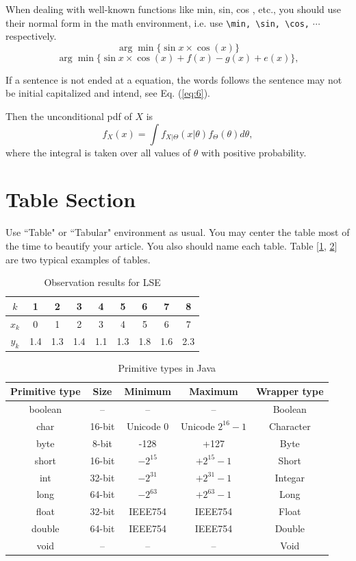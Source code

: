 \documentclass[print]{jicspack}
\begin{document}
When dealing with well-known functions like min, sin, cos , etc.,
you should use their normal form in the math environment, i.e. use
\verb|\min, \sin, \cos,| $\cdots$ respectively.
$$\arg\min\{\sin{x}\times\cos(x)\}$$
$$\arg\min\{\sin{x}\times\cos(x)+f(x)-g(x)+e(x)\},$$

If a sentence is not ended at a equation, the words follows the
sentence may not be initial capitalized and intend, see Eq.
(\ref{eq:6}).

 Then the unconditional pdf of $X$ is
\begin{equation}\label{eq:6}
f_X(x)=\int f_{X|\Theta}(x|\theta)f_{\Theta}(\theta)d\theta,
\end{equation}
where the integral is taken over all values of $\theta$ with positive probability.
\section{Table Section}
Use ``Table" or ``Tabular" environment as usual. You may center
the table most of the time to beautify your article. You also
should name each table. Table [\ref{lab:1}, \ref{lab:2}] are two
typical examples of tables.
\begin{table}[h]
\centering \caption{Observation results for LSE} \label{lab:1}
\begin{tabular}{|c|c|c|c|c|c|c|c|c|}
\hline $k$   & 1 & 2 & 3 & 4 & 5 & 6 & 7 & 8\\
\hline $x_k$ & 0 & 1 & 2 & 3 & 4 & 5 & 6 & 7\\
\hline $y_k$ & 1.4 & 1.3 & 1.4 & 1.1 & 1.3 & 1.8 & 1.6 & 2.3\\
\hline
\end{tabular}
\end{table}
\begin{table}[h]
\centering \caption{Primitive types in Java}
\label{lab:2}
\begin{tabular}{|c|c|c|c|c|}
\hline
Primitive type & Size & Minimum & Maximum & Wrapper type\\\hline
boolean & -- & -- & -- & Boolean\\\hline
char & 16-bit & Unicode 0 & Unicode $2^{16}-1$ & Character\\\hline
byte & 8-bit & -128 & +127 & Byte\\\hline
short & 16-bit & $-2^{15}$ & $+2^{15}-1$ & Short\\\hline
int & 32-bit & $-2^{31}$ & $+2^{31}-1$ & Integar\\\hline
long & 64-bit & $-2^{63}$ & $+2^{63}-1$ & Long\\\hline
float & 32-bit & IEEE754 & IEEE754 & Float\\\hline
double & 64-bit & IEEE754 & IEEE754 & Double\\\hline
void & -- & -- & -- & Void\\\hline
\end{tabular}
\end{table}
\end{document}
